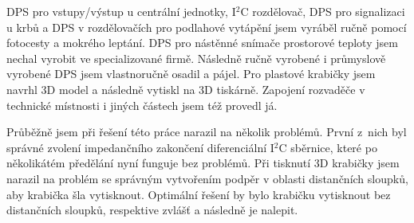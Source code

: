 DPS pro vstupy/výstup u centrální jednotky, I$^{2}$C rozdělovač, DPS pro signalizaci u krbů a DPS v rozdělovačích pro podlahové vytápění jsem vyráběl ručně pomocí fotocesty a mokrého leptání. DPS pro nástěnné snímače prostorové teploty jsem nechal vyrobit ve specializované firmě. Následně ručně vyrobené i průmyslově vyrobené DPS jsem vlastnoručně osadil a pájel. Pro plastové krabičky jsem navrhl 3D model a následně vytiskl na 3D tiskárně. Zapojení rozvaděče v technické místnosti i jiných částech jsem též provedl já.

Průběžně jsem při řešení této práce narazil na několik problémů. První z~nich byl správné zvolení impedančního zakončení diferenciální I$^{2}$C sběrnice, které po několikátém předělání nyní funguje bez problémů. Při tisknutí 3D krabičky jsem narazil na problém se správným vytvořením podpěr v oblasti distančních sloupků, aby krabička šla vytisknout. Optimální řešení by bylo krabičku vytisknout bez distančních sloupků, respektive zvlášť a následně je nalepit.

